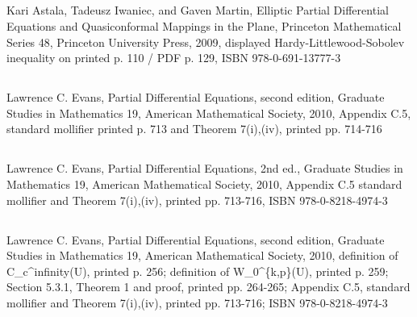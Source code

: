 \documentclass[10pt,oneside]{article}
\begin{document}
\subsection*{\texttt{}}
Kari Astala, Tadeusz Iwaniec, and Gaven Martin, Elliptic Partial Differential Equations and Quasiconformal Mappings in the Plane, Princeton Mathematical Series 48, Princeton University Press, 2009, displayed Hardy-Littlewood-Sobolev inequality on printed p. 110 / PDF p. 129, ISBN 978-0-691-13777-3

\subsection*{\texttt{}}
Lawrence C. Evans, Partial Differential Equations, second edition, Graduate Studies in Mathematics 19, American Mathematical Society, 2010, Appendix C.5, standard mollifier printed p. 713 and Theorem 7(i),(iv), printed pp. 714-716

\subsection*{\texttt{}}
Lawrence C. Evans, Partial Differential Equations, 2nd ed., Graduate Studies in Mathematics 19, American Mathematical Society, 2010, Appendix C.5 standard mollifier and Theorem 7(i),(iv), printed pp. 713-716, ISBN 978-0-8218-4974-3

\subsection*{\texttt{}}
Lawrence C. Evans, Partial Differential Equations, second edition, Graduate Studies in Mathematics 19, American Mathematical Society, 2010, definition of C\_c\textasciicircum{}infinity(U), printed p. 256; definition of W\_0\textasciicircum{}\{k,p\}(U), printed p. 259; Section 5.3.1, Theorem 1 and proof, printed pp. 264-265; Appendix C.5, standard mollifier and Theorem 7(i),(iv), printed pp. 713-716; ISBN 978-0-8218-4974-3
\end{document}
